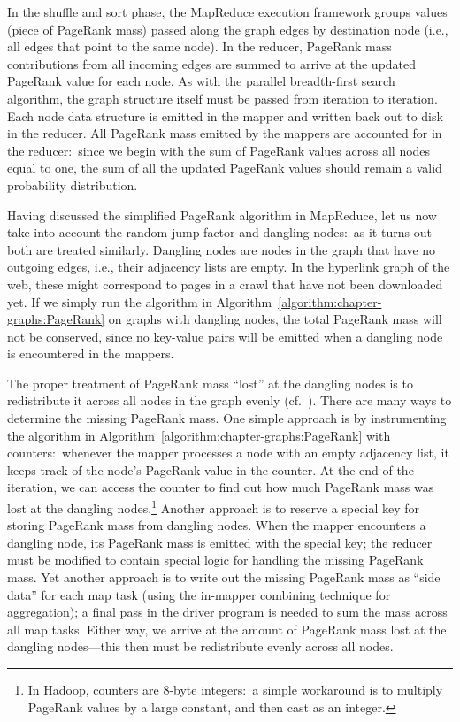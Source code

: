 In the shuffle and sort phase, the MapReduce execution framework
groups values (piece of PageRank mass) passed along the graph edges by
destination node (i.e., all edges that point to the same node).  In
the reducer, PageRank mass contributions from all incoming edges are
summed to arrive at the updated PageRank value for each node.  As with
the parallel breadth-first search algorithm, the graph structure
itself must be passed from iteration to iteration.  Each node data
structure is emitted in the mapper and written back out to disk in the
reducer.  All PageRank mass emitted by the mappers are accounted for
in the reducer:\ since we begin with the sum of PageRank values across
all nodes equal to one, the sum of all the updated PageRank values
should remain a valid probability distribution.

Having discussed the simplified PageRank algorithm in MapReduce, let
us now take into account the random jump factor and dangling
nodes:\ as it turns out both are treated similarly.  Dangling nodes
are nodes in the graph that have no outgoing edges, i.e., their
adjacency lists are empty.  In the hyperlink graph of the web, these
might correspond to pages in a crawl that have not been downloaded
yet.  If we simply run the algorithm in
Algorithm~\ref{algorithm:chapter-graphs:PageRank} on graphs with dangling nodes,
the total PageRank mass will not be conserved, since no key-value
pairs will be emitted when a dangling node is encountered in the
mappers.

The proper treatment of PageRank mass ``lost'' at the dangling nodes
is to redistribute it across all nodes in the graph evenly
(cf.~\cite{Bianchini_etal_2005}).  There are many ways to determine
the missing PageRank mass.  One simple approach is by instrumenting
the algorithm in Algorithm~\ref{algorithm:chapter-graphs:PageRank} with
counters:\ whenever the mapper processes a node with an empty
adjacency list, it keeps track of the node's PageRank value in the
counter.  At the end of the iteration, we can access the counter to
find out how much PageRank mass was lost at the dangling
nodes.\footnote{In Hadoop, counters are 8-byte integers:\ a simple
  workaround is to multiply PageRank values by a large constant, and
  then cast as an integer.}  Another approach is to reserve a special
key for storing PageRank mass from dangling nodes.  When the mapper
encounters a dangling node, its PageRank mass is emitted with the
special key; the reducer must be modified to contain special logic for
handling the missing PageRank mass.  Yet another approach is to write
out the missing PageRank mass as ``side data'' for each map task
(using the in-mapper combining technique for aggregation); a final
pass in the driver program is needed to sum the mass across all map
tasks.  Either way, we arrive at the amount of PageRank mass lost at
the dangling nodes---this then must be redistribute evenly across all
nodes.

